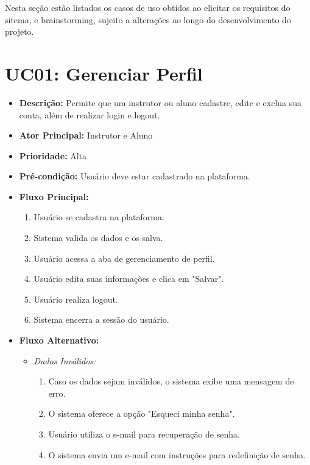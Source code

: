         Nesta seção estão listados os casos de uso obtidos ao elicitar os requisitos do sitema, e brainstorming, sujeito a alterações ao longo do desenvolvimento do projeto.

        \section*{UC01: Gerenciar Perfil}

        \begin{itemize}
            \item \textbf{Descrição:} Permite que um instrutor ou aluno cadastre, edite e exclua sua conta, além de realizar login e logout.
            
            \item \textbf{Ator Principal:} Instrutor e Aluno
            
            \item \textbf{Prioridade:} Alta
            
            \item \textbf{Pré-condição:} Usuário deve estar cadastrado na plataforma.
            
            \item \textbf{Fluxo Principal:}
            \begin{enumerate}
                \item Usuário se cadastra na plataforma.
                \item Sistema valida os dados e os salva.
                \item Usuário acessa a aba de gerenciamento de perfil.
                \item Usuário edita suas informações e clica em "Salvar".
                \item Usuário realiza logout.
                \item Sistema encerra a sessão do usuário.
            \end{enumerate}

            \item \textbf{Fluxo Alternativo:}
            \begin{itemize}
                \item \textit{Dados Inválidos:}
                \begin{enumerate}
                    \item Caso os dados sejam inválidos, o sistema exibe uma mensagem de erro.
                    \item O sistema oferece a opção "Esqueci minha senha".
                    \item Usuário utiliza o e-mail para recuperação de senha.
                    \item O sistema envia um e-mail com instruções para redefinição de senha.
                \end{enumerate}
            \end{itemize}
        \end{itemize}

